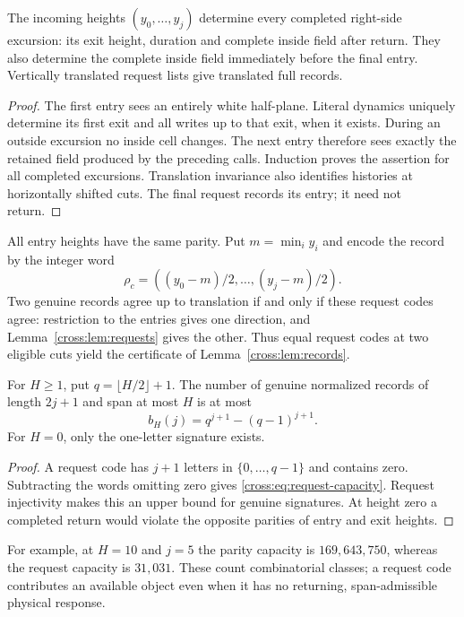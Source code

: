 \begin{lemma}\label{cross:lem:requests}
The incoming heights $(y_0,\ldots,y_j)$ determine every completed right-side
excursion: its exit height, duration and complete inside field after return.
They also determine the complete inside field immediately before the final
entry. Vertically translated request lists give translated full records.
\end{lemma}
\begin{proof}
The first entry sees an entirely white half-plane. Literal dynamics uniquely
determine its first exit and all writes up to that exit, when it exists.
During an outside excursion no inside cell changes. The next entry therefore
sees exactly the retained field produced by the preceding calls. Induction
proves the assertion for all completed excursions. Translation invariance
also identifies histories at horizontally shifted cuts. The final request
records its entry; it need not return.
\end{proof}
All entry heights have the same parity. Put $m=\min_i y_i$ and encode the
record by the integer word
\[
 \rho_c=((y_0-m)/2,\ldots,(y_j-m)/2).
\]
Two genuine records agree up to translation if and only if these request codes
agree: restriction to the entries gives one direction, and
Lemma~\ref{cross:lem:requests} gives the other. Thus equal request codes at two
eligible cuts yield the certificate of Lemma~\ref{cross:lem:records}.

\begin{proposition}\label{cross:prop:requests}
For $H\ge1$, put $q=\lfloor H/2\rfloor+1$. The number of genuine normalized
records of length $2j+1$ and span at most $H$ is at most
\begin{equation}
 b_H(j)=q^{j+1}-(q-1)^{j+1}.\label{cross:eq:request-capacity}
\end{equation}
For $H=0$, only the one-letter signature exists.
\end{proposition}
\begin{proof}
A request code has $j+1$ letters in $\{0,\ldots,q-1\}$ and contains zero.
Subtracting the words omitting zero gives \eqref{cross:eq:request-capacity}.
Request injectivity makes this an upper bound for genuine signatures. At
height zero a completed return would violate the opposite parities of entry
and exit heights.
\end{proof}
For example, at $H=10$ and $j=5$ the parity capacity is $169{,}643{,}750$,
whereas the request capacity is $31{,}031$. These count combinatorial classes;
a request code contributes an available object even when it has no returning,
span-admissible physical response.

